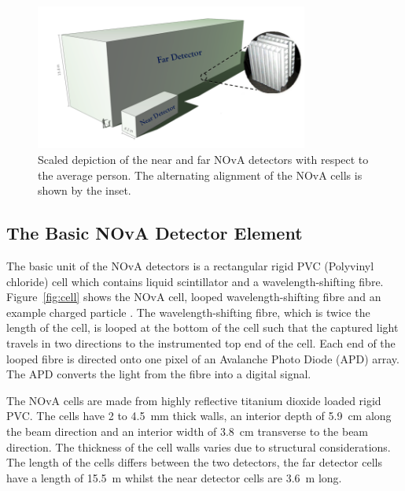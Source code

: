 \begin{figure}
  \centering
  \includegraphics[width=0.8\textwidth]{../../img/det/gen/both_detectors.png} 
  \caption{
    Scaled depiction of the near and far NOvA
    detectors with respect to the average person.
    The alternating alignment of the NOvA
    cells is shown by the inset. }
  \label{fig:bothDets}
\end{figure} 


\subsection{The Basic NOvA Detector Element} \label{sec:cell}

The basic unit of the NOvA detectors is a rectangular rigid PVC
(Polyvinyl chloride) cell
which contains liquid scintillator and a wavelength-shifting
fibre. %
Figure~\ref{fig:cell} shows the NOvA cell, looped wavelength-shifting
fibre and an example charged particle .
The wavelength-shifting fibre, which is twice
the length of the 
cell, is looped at the bottom of the cell such that the captured light
travels in two directions to the instrumented top end of the cell. 
Each end of the looped fibre is directed onto one pixel of an
Avalanche Photo Diode (APD) array.
The APD converts the light from the fibre into a digital signal.


The NOvA cells are made from highly reflective titanium dioxide loaded
rigid PVC. The cells have 2 to 4.5~mm thick walls, an interior depth
of 5.9~cm along the beam direction and an interior width of 3.8~cm
transverse to the beam direction. The thickness of the cell walls
varies due to structural considerations.
The length of the cells differs
between the two detectors, the far detector cells have a length of
15.5~m whilst the near detector cells are 3.6~m long.


